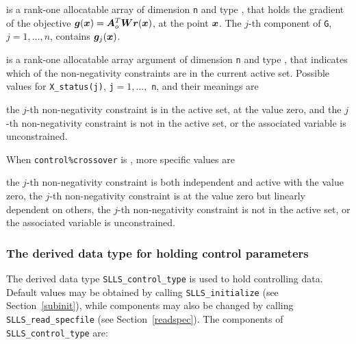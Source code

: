 \documentclass{galahad}
\newcommand{\packagename}{SLLS}
\begin{document}
\begin{description}
 is a rank-one allocatable array of dimension {\tt n} and type
\realdp, that holds the gradient of the objective
 ${\bm{g}}({\bm{x}}) = {\bm{A}}_o^T {\bm{W}} {\bm{r}}({\bm{x}})$, at the point ${\bm{x}}$. 
The $j$-th component of {\tt G}, $j = 1, \ldots, n$, contains ${\bm{g}}_{j}({\bm{x}})$.

 is a rank-one allocatable array argument of dimension {\tt n}
and type \integer, that indicates which of the non-negativity constraints
are in the current active set. Possible values for
{\tt X\_status(j)}, {\tt j}$=1, \ldots ,$ {\tt n}, and their meanings are
\begin{description}
 the $j$-th non-negativity constraint
is in the active set, at the value zero, and
  the $j$-th  non-negativity constraint is not in the active set,
or the associated variable is unconstrained.
\end{description}
When {\tt control\%crossover} is \true, more specific values are
\begin{description}
 the $j$-th  non-negativity constraint
is both independent and active with the value zero,
 the $j$-th  non-negativity constraint
is at the value zero but linearly dependent on others,
 the $j$-th non-negativity constraint is not in the active set,
or the associated variable is unconstrained.
\end{description}

\end{description}


\subsubsection{The derived data type for holding control
 parameters}\label{typecontrol}
The derived data type
{\tt \packagename\_control\_type}
is used to hold controlling data. Default values may be obtained by calling
{\tt \packagename\_initialize}
(see Section~\ref{subinit}),
while components may also be changed by calling
{\tt \packagename\_read\-\_specfile}
(see Section~\ref{readspec}).
The components of
{\tt \packagename\_control\_type}
are:
\end{document}
